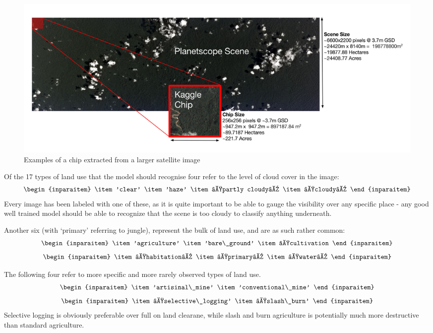 \documentclass[
	a4paper, %
	10pt, %
	unnumberedsections, %
	twoside, %
]{LTJournalArticle}
\begin{document}
\begin{figure} 
	\includegraphics[width=\linewidth]{Figures/chipdesc.jpg}
	\caption{Examples of a chip extracted from a larger satellite image \href{https://storage.googleapis.com/kaggle-competitions/kaggle/6322/media/chips.jpg}{}}
	\label{fig:tcanther}
\end{figure}

Of the 17 types of land use that the model should recognise four refer to the level of cloud cover in the image:
\[\begin{inparaitem}
	\item 'clear'
	\item 'haze'
	\item ‘partly cloudy’
    \item ‘cloudy’
\end{inparaitem}\]
Every image has been labeled with one of these, as it is quite important to be able to gauge the visibility over any specific place - any good well trained model should be able to recognize that the scene is too cloudy to classify anything underneath.

Another six (with ‘primary’ referring to jungle), represent the bulk of land use, and are as such rather common:
\[\begin{inparaitem}
	\item 'agriculture'
	\item 'bare\_ground'
	\item ‘cultivation
\end{inparaitem}\]
 \[\begin{inparaitem}
    \item ‘habitation’
    \item ‘primary’
    \item ‘water’
\end{inparaitem}\]

The following four refer to more specific and more rarely observed types of land use.
\[\begin{inparaitem}
	\item 'artisinal\_mine'
	\item 'conventional\_mine'
 \end{inparaitem}\]
 \[\begin{inparaitem}
	\item ‘selective\_logging'
	\item ‘slash\_burn'
\end{inparaitem}\]
Selective logging is obviously preferable over full on land clearane, while slash and burn agriculture is potentially much more destructive than standard agriculture.
\end{document}
